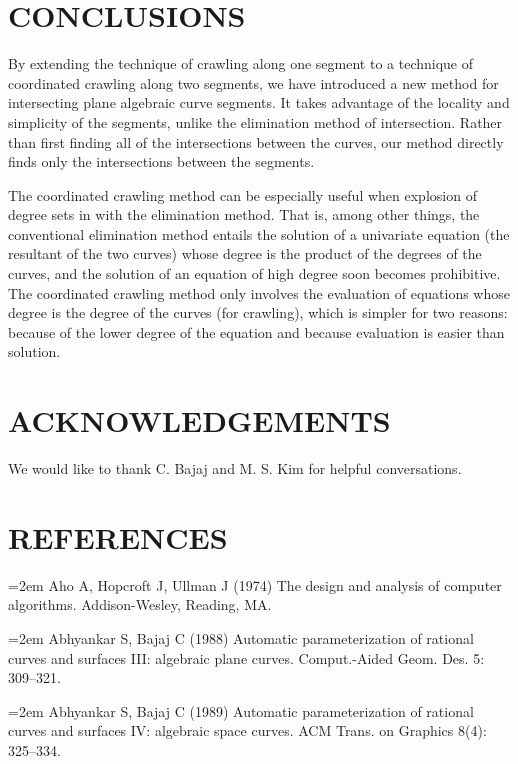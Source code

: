 \section{CONCLUSIONS}

By extending the technique of crawling along one segment to a technique of 
coordinated crawling along two segments,
we have introduced a new method for intersecting plane algebraic curve segments.
It takes advantage of the locality and simplicity of the segments, unlike the
elimination method of intersection.
Rather than first finding all of the intersections between the curves,
our method directly finds only the intersections between the segments.

The coordinated crawling method can be especially useful when explosion
of degree sets in with the elimination method.
That is, among other things, the conventional elimination method entails the solution of a 
univariate equation (the resultant of the two curves) whose degree is the product 
of the degrees of the curves, and the solution of an equation of high degree  
soon becomes prohibitive.
The coordinated crawling method only involves the evaluation of equations whose
degree is the degree of the curves (for crawling), which is simpler for two reasons:
because of the lower degree of the equation and because evaluation
is easier than solution.

\SingleSpace
\section*{ACKNOWLEDGEMENTS}
We would like to thank C. Bajaj and M. S. Kim for helpful conversations.

\section*{REFERENCES}


\parskip=0pt
\parindent=20pt
\hangindent=2em  %
Aho A, Hopcroft J, Ullman J (1974)
The design and analysis of computer algorithms.
Addison-Wesley, Reading, MA.

\hangindent=2em  %
\noindent 
Abhyankar S, Bajaj C (1988)
Automatic parameterization of rational curves and surfaces III:
algebraic plane curves.
Comput.-Aided Geom. Des. 5: 309--321.

\hangindent=2em  %
\noindent 
Abhyankar S, Bajaj C (1989)
Automatic parameterization of rational curves and surfaces IV:
algebraic space curves.
ACM Trans. on Graphics 8(4): 325--334.

